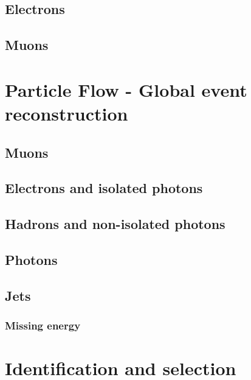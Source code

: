 \subsection{Electrons}


\subsection{Muons}
\label{sec:muonReco}


\section{Particle Flow - Global event reconstruction}
\label{sec:ParticleFlow}


\subsection{Muons}
\label{sec:PFmuo}


\subsection{Electrons and isolated photons}


\subsection{Hadrons and non-isolated photons}


\subsection{Photons}
\label{sec:photons}


\subsection{Jets}
\label{sec:jets}


\subsubsection{Missing energy}


\section{Identification and selection}
